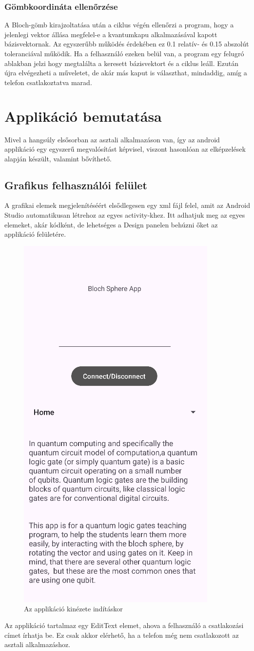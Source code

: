 \documentclass[
]{thesis-ekf}
\theoremstyle{definition}
\theoremstyle{remark}
\begin{document}
\subsubsection{Gömbkoordináta ellenőrzése}
A Bloch-gömb kirajzoltatása után a ciklus végén ellenőrzi a program, hogy a jelenlegi vektor állása megfelel-e a kvantumkapu alkalmazásával kapott bázisvektornak. Az egyszerűbb működés érdekében ez 0.1 relatív- és 0.15 abszolút toleranciával működik. Ha a felhasználó ezeken belül van, a program egy felugró ablakban jelzi hogy megtalálta a keresett bázisvektort és a ciklus leáll. Ezután újra elvégezheti a műveletet, de akár más kaput is választhat, mindaddig, amíg a telefon csatlakoztatva marad.

\section{Applikáció bemutatása}
Mivel a hangsúly elsősorban az asztali alkalmazáson van, így az android applikáció egy egyszerű megvalósítást képvisel, viszont hasonlóan az elképzelések alapján készült, valamint bővíthető.

\subsection{Grafikus felhasználói felület}
A grafikai elemek megjelenítéséért elsődlegesen egy xml fájl felel, amit az Android Studio automatikusan létrehoz az egyes activity-khez. Itt adhatjuk meg az egyes elemeket, akár kódként, de lehetséges a Design panelen behúzni őket az applikáció felületére.

\begin{figure}[H]
	\centering
	\includegraphics[width=0.25\linewidth]{app}
	\caption{Az applikáció kinézete indításkor}
	\label{fig:app}
\end{figure}

Az applikáció tartalmaz egy EditText elemet, ahova a felhasználó a csatlakozási címet írhatja be. Ez csak akkor elérhető, ha a telefon még nem csatlakozott az asztali alkalmazáshoz.
\end{document}
